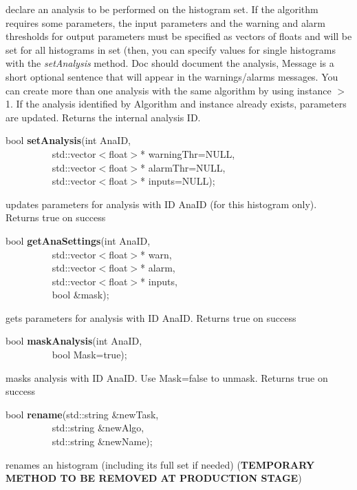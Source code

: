 declare an analysis to be performed on the histogram set. If the algorithm
 requires some parameters, the input parameters and the warning and alarm 
 thresholds for output parameters must be
 specified as vectors of floats and will be set for all histograms in
 set (then, you can specify values for single histograms with the {\it
 setAnalysis} method. Doc should document the analysis, Message is a short
 optional sentence that will appear in the warnings/alarms messages.
 You can create more than one analysis
 with the same algorithm by using instance $>$ 1. If the analysis
 identified by Algorithm and instance already exists, parameters are
 updated. Returns the internal analysis ID.


\item    bool {\bf setAnalysis}(int AnaID,\\\mbox{}~~~~~~~~~ 
                   std::vector$<$float$>$* warningThr=NULL,\\\mbox{}~~~~~~~~~ 
                   std::vector$<$float$>$* alarmThr=NULL,\\\mbox{}~~~~~~~~~ 
                   std::vector$<$float$>$* inputs=NULL);

 updates parameters for analysis with ID AnaID (for this histogram only). Returns true on success


\item    bool {\bf getAnaSettings}(int AnaID,\\\mbox{}~~~~~~~~~
                      std::vector$<$float$>$* warn,\\\mbox{}~~~~~~~~~ 
                      std::vector$<$float$>$* alarm,\\\mbox{}~~~~~~~~~
                      std::vector$<$float$>$* inputs,\\\mbox{}~~~~~~~~~
                      bool \&mask);

 gets parameters for analysis with ID AnaID. Returns true on success


\item    bool {\bf maskAnalysis}(int AnaID,\\\mbox{}~~~~~~~~~
                    bool Mask=true);

 masks analysis with ID AnaID. Use Mask=false to unmask. Returns true on success


\item    bool {\bf rename}(std::string \&newTask,\\\mbox{}~~~~~~~~~
              std::string \&newAlgo,\\\mbox{}~~~~~~~~~
              std::string \&newName);

 renames an histogram (including its full set if needed) 
 ({\bf TEMPORARY METHOD TO BE REMOVED AT PRODUCTION STAGE})


